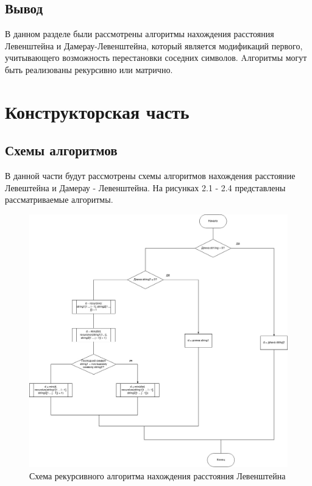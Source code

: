 \documentclass[12pt]{report}
\begin{document}
\section{Вывод}
	В данном разделе были рассмотрены алгоритмы нахождения расстояния Левенштейна и Дамерау-Левенштейна, который является модификаций первого, учитывающего возможность перестановки соседних символов. Aлгоритмы могут быть реализованы рекурсивно или матрично.
	
\clearpage

\chapter{Конструкторская часть}

\section{Схемы алгоритмов}
В данной части будут рассмотрены схемы алгоритмов нахождения расстояние Левештейна и Дамерау - Левенштейна. На рисунках 2.1 - 2.4 представлены рассматриваемые алгоритмы.

\begin{figure}[h]
	\centering
	\includegraphics[width=0.75\linewidth]{rec.jpg}
	\caption{Схема рекурсивного алгоритма нахождения расстояния Левенштейна}
	\label{fig:mpr}
\end{figure}

\newpage
\end{document}
